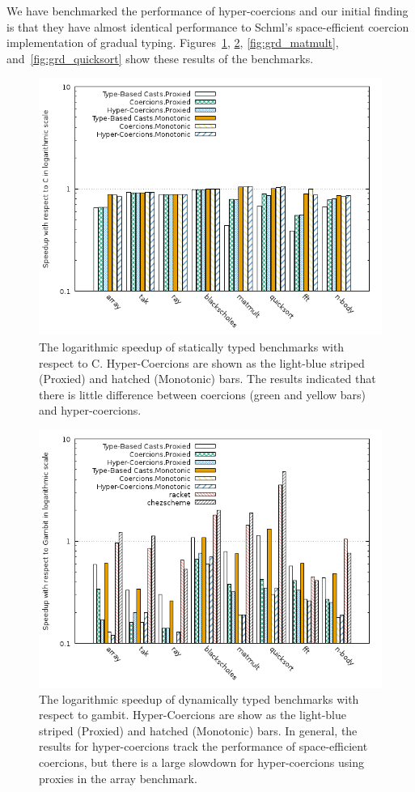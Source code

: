 \documentclass[acmtog, authorversion, acmlarge]{acmart}
\begin{document}
We have benchmarked the performance of hyper-coercions and our initial
finding is that they have almost identical performance to Schml's
space-efficient coercion implementation of gradual typing.
Figures~\ref{fig:static_results}, \ref{fig:dyn_results},
\ref{fig:grd_matmult}, and~\ref{fig:grd_quicksort} show these results
of the benchmarks.

\begin{figure}
  \includegraphics[scale=.47]{static.png}
  \caption{
    The logarithmic speedup of statically typed benchmarks
    with respect to C. Hyper-Coercions are shown as the light-blue
    striped (Proxied) and hatched (Monotonic) bars. The
    results indicated that there is little difference
    between coercions (green and yellow bars) and hyper-coercions. }
  \label{fig:static_results}
\end{figure}

\begin{figure}
  \includegraphics[scale=.47]{dyn.png}
  \caption{
    The logarithmic speedup of dynamically typed benchmarks
    with respect to gambit. Hyper-Coercions are show as the light-blue
    striped (Proxied) and hatched (Monotonic) bars. In general,
    the results for hyper-coercions track the performance of
    space-efficient coercions, but there is a large slowdown for
    hyper-coercions using proxies in the array benchmark.}
  \label{fig:dyn_results}
\end{figure}
\end{document}
